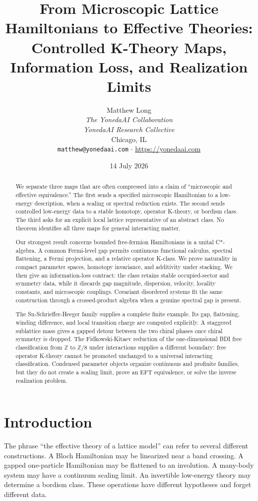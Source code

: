 \documentclass[12pt]{article}
\title{From Microscopic Lattice Hamiltonians to Effective Theories:\\
Controlled K-Theory Maps, Information Loss, and Realization Limits}
\author{Matthew Long\\
\textit{The YonedaAI Collaboration}\\
\textit{YonedaAI Research Collective}\\
Chicago, IL\\
\texttt{matthew@yonedaai.com} $\cdot$ \url{https://yonedaai.com}}
\date{14 July 2026}
\theoremstyle{definition}
\theoremstyle{remark}
\newcommand{\Z}{\mathbb Z}
\begin{document}
\maketitle

\begin{abstract}
We separate three maps that are often compressed into a claim of
``microscopic and effective equivalence.''  The first sends a specified
microscopic Hamiltonian to a low-energy description, when a scaling or
spectral reduction exists.  The second sends controlled low-energy data to a
stable homotopy, operator K-theory, or bordism class.  The third asks for an
explicit local lattice representative of an abstract class.  No theorem
identifies all three maps for general interacting matter.

Our strongest result concerns bounded free-fermion Hamiltonians in a unital
C*-algebra.  A common Fermi-level gap permits continuous functional calculus,
spectral flattening, a Fermi projection, and a relative operator K-class.
We prove naturality in compact parameter spaces, homotopy invariance, and
additivity under stacking.  We then give an information-loss contract: the
class retains stable occupied-sector and symmetry data, while it discards gap
magnitude, dispersion, velocity, locality constants, and microscopic
couplings.  Covariant disordered systems fit the same construction through a
crossed-product algebra when a genuine spectral gap is present.

The Su-Schrieffer-Heeger family supplies a complete finite example.  Its
gap, flattening, winding difference, and local transition charge are computed
explicitly.  A staggered sublattice mass gives a gapped detour between the two
chiral phases once chiral symmetry is dropped.  The Fidkowski-Kitaev reduction
of the one-dimensional BDI free classification from $\Z$ to $\Z/8$ under
interactions supplies a different boundary: free operator K-theory cannot be
promoted unchanged to a universal interacting classification.  Condensed
parameter objects organize continuous and profinite families, but they do not
create a scaling limit, prove an EFT equivalence, or solve the inverse
realization problem.
\end{abstract}

\tableofcontents

\section{Introduction}

The phrase ``the effective theory of a lattice model'' can refer to several
different constructions.
A Bloch Hamiltonian may be linearized near a band crossing.
A gapped one-particle Hamiltonian may be flattened to an involution.
A many-body system may have a continuum scaling limit.
An invertible low-energy theory may determine a bordism class.
These operations have different hypotheses and forget different data.
\end{document}
